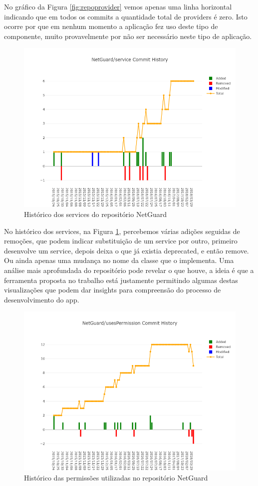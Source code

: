 \documentclass[a4paper,12pt]{article}
\begin{document}
{No gráfico da Figura \ref{fig:repoprovider} vemos apenas uma linha horizontal indicando que em todos os commits a quantidade total de providers é zero. Isto ocorre por que em nenhum momento a aplicação fez uso deste tipo de componente, muito provavelmente por não ser necessário neste tipo de aplicação.

\begin{figure}[H]
\centering
\includegraphics[width=\linewidth,height=0.5\linewidth]{imgs/NetGuard_service_history.png}
\caption{Histórico dos services do repositório NetGuard}
\label{fig:reposervice}
\end{figure}

No histórico dos services, na Figura \ref{fig:reposervice}, percebemos várias adições seguidas de remoções, que podem indicar substituição de um service por outro, primeiro desenvolve um service,  depois deixa o que já existia deprecated, e então remove. Ou ainda apenas uma mudança no nome da classe que o implementa. Uma análise mais aprofundada do repositório pode revelar o que houve, a ideia é que a ferramenta proposta no trabalho está justamente permitindo algumas destas visualizações que podem dar insights para compreensão do processo de desenvolvimento do app.

\begin{figure}[H]
\centering
\includegraphics[width=\linewidth,height=0.5\linewidth]{imgs/NetGuard_usesPermission_history.png}
\caption{Histórico das permissões utilizadas no repositório NetGuard}
\label{fig:repouses}
\end{figure}

}
\end{document}

